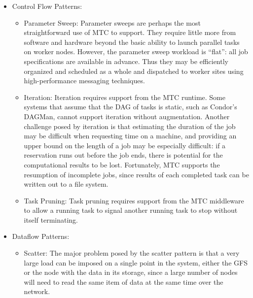 \documentclass[10pt,letterpaper]{article}
\begin{document}
\begin{itemize}

\item Control Flow Patterns:

  \begin{itemize}

  \item Parameter Sweep: Parameter sweeps are perhaps the most
    straightforward use of MTC to support. They require little more from
    software and hardware beyond the basic ability to launch parallel
    tasks on worker nodes.  However, the
    parameter sweep workload is ``flat'': all job specifications are
    available in advance.  Thus they may be efficiently organized and
    scheduled as a whole and dispatched to worker sites using high-performance messaging techniques.

  \item Iteration: Iteration requires support from the MTC
    runtime.  Some systems that assume that the DAG of tasks is static,
    such as Condor's DAGMan, cannot support iteration without augmentation.
    Another challenge posed by iteration is that 
    estimating the duration of the job may be difficult when requesting time on a
    machine, and providing an upper
    bound on the length of a job may be especially difficult: if a reservation runs
    out before the job ends, there is potential for the computational results 
    to be lost.  Fortunately, MTC supports
    the resumption of incomplete jobs, since results of each completed
    task can be written out to a file system.

  \item Task Pruning: Task pruning requires support from the MTC
    middleware to allow a running task to signal another running task
    to stop without itself terminating.

  \end{itemize}

\item Dataflow Patterns:

  \begin{itemize}

  \item Scatter: The major problem posed by the scatter pattern is that
    a very large load can be imposed on a single point in the system,
    either the GFS or the node with the data in its storage, since a
    large number of nodes will need to read the same item of data at
    the same time over the network.


\end{itemize}
\end{itemize}
\end{document}
